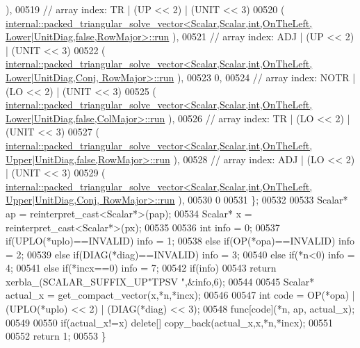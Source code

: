 \begin{DoxyCode}
      ),
00519     \textcolor{comment}{// array index: TR    | (UP << 2) | (UNIT  << 3)}
00520     (
      \hyperlink{structinternal_1_1packed__triangular__solve__vector}{internal::packed\_triangular\_solve\_vector<Scalar,Scalar,int,OnTheLeft, Lower|UnitDiag,false,RowMajor>::run}
      ),
00521     \textcolor{comment}{// array index: ADJ   | (UP << 2) | (UNIT  << 3)}
00522     (
      \hyperlink{structinternal_1_1packed__triangular__solve__vector}{internal::packed\_triangular\_solve\_vector<Scalar,Scalar,int,OnTheLeft, Lower|UnitDiag,Conj, RowMajor>::run}
      ),
00523     0,
00524     \textcolor{comment}{// array index: NOTR  | (LO << 2) | (UNIT  << 3)}
00525     (
      \hyperlink{structinternal_1_1packed__triangular__solve__vector}{internal::packed\_triangular\_solve\_vector<Scalar,Scalar,int,OnTheLeft, Lower|UnitDiag,false,ColMajor>::run}
      ),
00526     \textcolor{comment}{// array index: TR    | (LO << 2) | (UNIT  << 3)}
00527     (
      \hyperlink{structinternal_1_1packed__triangular__solve__vector}{internal::packed\_triangular\_solve\_vector<Scalar,Scalar,int,OnTheLeft, Upper|UnitDiag,false,RowMajor>::run}
      ),
00528     \textcolor{comment}{// array index: ADJ   | (LO << 2) | (UNIT  << 3)}
00529     (
      \hyperlink{structinternal_1_1packed__triangular__solve__vector}{internal::packed\_triangular\_solve\_vector<Scalar,Scalar,int,OnTheLeft, Upper|UnitDiag,Conj, RowMajor>::run}
      ),
00530     0
00531   \};
00532 
00533   Scalar* ap = \textcolor{keyword}{reinterpret\_cast<}Scalar*\textcolor{keyword}{>}(pap);
00534   Scalar* x = \textcolor{keyword}{reinterpret\_cast<}Scalar*\textcolor{keyword}{>}(px);
00535 
00536   \textcolor{keywordtype}{int} info = 0;
00537   \textcolor{keywordflow}{if}(UPLO(*uplo)==INVALID)                                            info = 1;
00538   \textcolor{keywordflow}{else} \textcolor{keywordflow}{if}(OP(*opa)==INVALID)                                          info = 2;
00539   \textcolor{keywordflow}{else} \textcolor{keywordflow}{if}(DIAG(*diag)==INVALID)                                       info = 3;
00540   \textcolor{keywordflow}{else} \textcolor{keywordflow}{if}(*n<0)                                                       info = 4;
00541   \textcolor{keywordflow}{else} \textcolor{keywordflow}{if}(*incx==0)                                                   info = 7;
00542   \textcolor{keywordflow}{if}(info)
00543     \textcolor{keywordflow}{return} xerbla\_(SCALAR\_SUFFIX\_UP\textcolor{stringliteral}{"TPSV "},&info,6);
00544 
00545   Scalar* actual\_x = get\_compact\_vector(x,*n,*incx);
00546 
00547   \textcolor{keywordtype}{int} code = OP(*opa) | (UPLO(*uplo) << 2) | (DIAG(*diag) << 3);
00548   func[code](*n, ap, actual\_x);
00549 
00550   \textcolor{keywordflow}{if}(actual\_x!=x) \textcolor{keyword}{delete}[] copy\_back(actual\_x,x,*n,*incx);
00551 
00552   \textcolor{keywordflow}{return} 1;
00553 \}
\end{DoxyCode}
